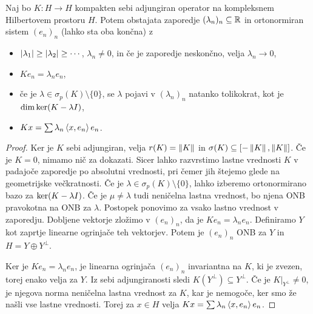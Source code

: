 
\begin{izrek}
  Naj bo $K: H \to H$ kompakten sebi adjungiran operator na kompleksnem
  Hilbertovem prostoru $H$.
  Potem obstajata zaporedje $(\lambda_n)_n \subseteq \mathbb{R}$ in ortonormiran sistem
  $(e_n)_n$ (lahko sta oba končna) z
  \begin{itemize}
  \item $\left| \lambda_1 \right| \ge \left| \lambda_2 \right| \ge \cdots$, $\lambda_n \ne 0$, in
	če je zaporedje neskončno, velja $\lambda_n \to 0$,
  \item $K e_n = \lambda_n e_n$,
  \item če je $\lambda \in \sigma_p(K) \setminus \{0\}$, se $\lambda$ pojavi v
	$(\lambda_n)_n$ natanko tolikokrat, kot je $\dim \operatorname{ker} (K - \lambda I)$,
  \item $Kx = \sum \lambda_n \left< x, e_n \right> e_n$.
  \end{itemize}
\end{izrek}

\begin{proof}
  Ker je $K$ sebi adjungiran, velja $r(K) = \left\lVert K\right\rVert$ in $\sigma(K) \subseteq
  [-\left\lVert K\right\rVert, \left\lVert K\right\rVert]$.
  Če je $K = 0$, nimamo nič za dokazati.
  Sicer lahko razvrstimo lastne vrednosti $K$ v padajoče zaporedje po absolutni
  vrednosti, pri čemer jih štejemo glede na geometrijske večkratnosti.
  Če je $\lambda \in \sigma_p(K) \setminus \{0\}$, lahko izberemo ortonormirano
  bazo za $\operatorname{ker} (K - \lambda I)$.
  Če je $\mu \ne \lambda$ tudi neničelna lastna vrednost, bo njena ONB
  pravokotna na ONB za $\lambda$.
  Postopek ponovimo za vsako lastno vrednost v zaporedju.
  Dobljene vektorje zložimo v $(e_n)_n$, da je $K e_n = \lambda_n e_n$.
  Definiramo $Y$ kot zaprtje linearne ogrinjače teh vektorjev.
  Potem je $(e_n)_n$ ONB za $Y$ in $H = Y \oplus Y^\bot$.

  Ker je $K e_n = \lambda_n e_n$, je linearna ogrinjača $(e_n)_n$ invariantna na
  $K$, ki je zvezen, torej enako velja za $Y$.
  Iz sebi adjungiranosti sledi $K(Y^\bot) \subseteq Y^\bot$.
  Če je $\left. K \right|_{Y^\bot} \ne 0$, je njegova norma neničelna lastna
  vrednost za $K$, kar je nemogoče, ker smo že našli vse lastne vrednosti.
  Torej za $x \in H$ velja $Kx = \sum \lambda_n \left< x, e_n \right> e_n$.
\end{proof}


